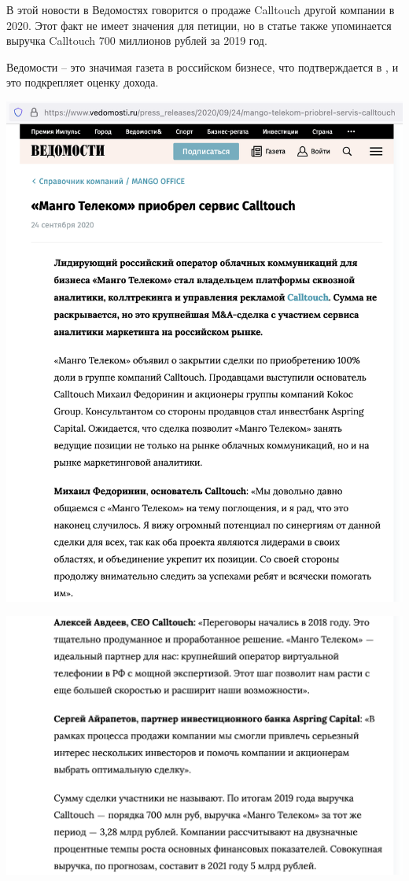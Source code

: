 
В этой новости в Ведомостях говорится о продаже Calltouch другой компании в 2020.
Этот факт не имеет значения для петиции, но в статье также упоминается выручка Calltouch
700 миллионов рублей за 2019 год.

Ведомости -- это значимая газета в российском бизнесе, что подтверждается в ,
и это подкрепляет оценку дохода.



\includegraphics[width=\textwidth]{calltouch-sold-vedomosti-p1}
\WillContinue

\pagebreak

\Continuing
\includegraphics[width=\textwidth]{calltouch-sold-vedomosti-p2}

\pagebreak
